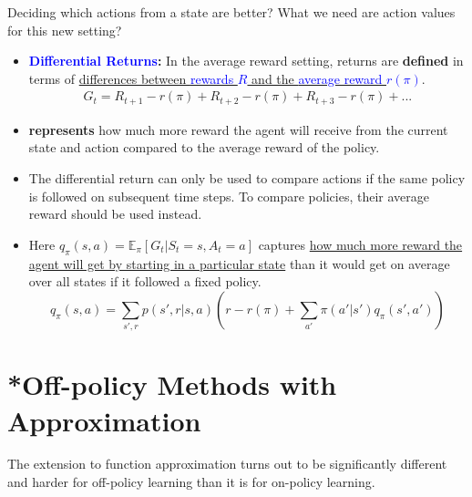 \documentclass[12pt, a4paper]{article}
\let\stdsection\section
\renewcommand\section{\newpage\stdsection} %
\begin{document}
Deciding which actions from a state are better? What we need are action values for this new setting?
\begin{itemize}
  \item \textbf{\textcolor{blue}{Differential Returns}:} In the average reward setting, returns are \textbf{defined} in terms of \uline{differences between \textcolor{blue}{rewards $R$} and the \textcolor{blue}{average reward $r(\pi)$}}.
  \begin{gather*}
  G_t = R_{t+1} - r(\pi) + R_{t+2} - r(\pi) + R_{t+3} - r(\pi) + ...
  \end{gather*}
  \item \textbf{represents} how much more reward the agent will receive from the current state and action compared to the average reward of the policy.
  \item The differential return can only be used to compare actions if the same policy is followed on subsequent time steps. To compare policies, their average reward should be used instead.
  \item Here $q_\pi(s,a) = \mathbb{E}_\pi[G_t | S_t = s, A_t = a]$ captures \uline{how much more reward the agent will get by starting in a particular state} than it would get on average over all states if it followed a fixed policy.
  $$
  q_\pi(s,a) = \sum_{s',r} p(s',r | s,a) (r-r(\pi) + \sum_{a'} \pi(a'|s') q_\pi(s',a'))
  $$
\end{itemize}
































\section{*Off-policy Methods with Approximation}\label{off-policy-methods-with-approximation}

The extension to function approximation turns out to be significantly different and harder for off-policy learning than it is for on-policy learning.
\end{document}
